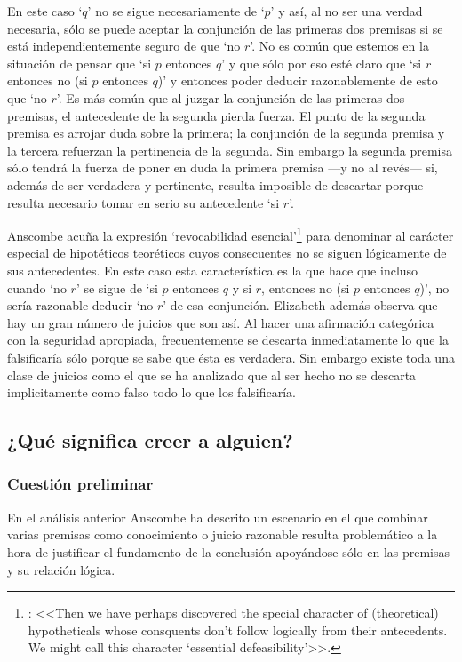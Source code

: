  En este caso `$q$' no se sigue necesariamente de `$p$' y así, al no ser una
  verdad necesaria, sólo se puede aceptar la conjunción de las primeras dos
  premisas si se está independientemente seguro de que `no $r$'. No es común que
  estemos en la situación de pensar que `si $p$ entonces $q$' y que sólo por eso
  esté claro que `si $r$ entonces no (si $p$ entonces $q$)' y entonces poder
  deducir razonablemente de esto que `no $r$'. Es más común que al juzgar la
  conjunción de las primeras dos premisas, el antecedente de la segunda pierda
  fuerza. El punto de la segunda premisa es arrojar duda sobre la primera; la
  conjunción de la segunda premisa y la tercera refuerzan la pertinencia de la
  segunda. Sin embargo la segunda premisa sólo tendrá la fuerza de poner en duda
  la primera premisa ---y no al revés--- si, además de ser verdadera y
  pertinente, resulta imposible de descartar porque resulta necesario tomar en
  serio su antecedente `si $r$'\autocite[Cf.~][301]{anscombe2015logic:qpa}.

  Anscombe acuña la expresión `revocabilidad
  esencial'\footnote{\cite[Cf.~][301]{anscombe2015logic:qpa}: <<Then we have
    perhaps discovered the special character of (theoretical) hypotheticals
    whose consquents don't follow logically from their antecedents. We might
    call this character `essential defeasibility'>>.} para denominar al carácter
  especial de hipotéticos teoréticos cuyos consecuentes no se siguen lógicamente
  de sus antecedentes. En este caso esta característica es la que hace que
  incluso cuando `no $r$' se sigue de `si $p$ entonces $q$ y si $r$, entonces no
  (si $p$ entonces $q$)', no sería razonable deducir `no $r$' de esa conjunción.
  Elizabeth además observa que hay un gran número de juicios que son así. Al
  hacer una afirmación categórica con la seguridad apropiada, frecuentemente se
  descarta inmediatamente lo que la falsificaría sólo porque se sabe que ésta es
  verdadera. Sin embargo existe toda una clase de juicios como el que se ha
  analizado que al ser hecho no se descarta implicitamente como falso todo lo
  que los falsificaría\autocite[Cf.~][302]{anscombe2015logic:qpa}.

\subsection{¿Qué significa creer a alguien?}
\subsubsection{Cuestión preliminar}
En el análisis anterior Anscombe ha descrito un escenario en el que combinar
varias premisas como conocimiento o juicio razonable resulta problemático a la
hora de justificar el fundamento de la conclusión apoyándose sólo en las
premisas y su relación lógica.

